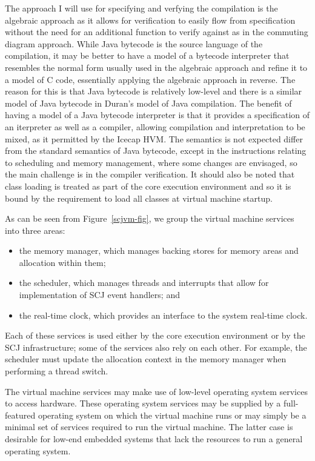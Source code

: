 \documentclass[a4paper,10pt]{article}
\begin{document}
The approach I will use for specifying and verfying the compilation is the
algebraic approach as it allows for verification to easily flow from
specification without the need for an additional function to verify against as
in the commuting diagram approach. While Java bytecode is the source language of
the compilation, it may be better to have a model of a bytecode interpreter that
resembles the normal form usually used in the algebraic approach and refine it
to a model of C code, essentially applying the algebraic approach in
reverse. The reason for this is that Java bytecode is relatively low-level and
there is a similar model of Java bytecode in Duran's model of Java
compilation. The benefit of having a model of a Java bytecode interpreter is
that it provides a specification of an iterpreter as well as a compiler,
allowing compilation and interpretation to be mixed, as it permitted by the
Icecap HVM. The semantics is not expected differ from the standard semantics of
Java bytecode, except in the instructions relating to scheduling and memory
management, where some changes are envisaged, so the main challenge is in the
compiler verification. It should also be noted that class loading is treated as
part of the core execution environment and so it is bound by the requirement to
load all classes at virtual machine startup.

As can be seen from Figure~\ref{scjvm-fig}, we group the virtual machine
services into three areas:
\begin{itemize}
\item the memory manager, which manages backing stores for memory areas and
  allocation within them;
\item the scheduler, which manages threads and interrupts that allow for
  implementation of SCJ event handlers; and
\item the real-time clock, which provides an interface to the system real-time
  clock.
\end{itemize}
Each of these services is used either by the core execution environment or by
the SCJ infrastructure; some of the services also rely on each other.  For
example, the scheduler must update the allocation context in the memory manager
when performing a thread switch.

The virtual machine services may make use of low-level operating system
services to access hardware.  These operating system services may be supplied by
a full-featured operating system on which the virtual machine runs or may simply
be a minimal set of services required to run the virtual machine.  The latter
case is desirable for low-end embedded systems that lack the resources to
run a general operating system.
\end{document}
